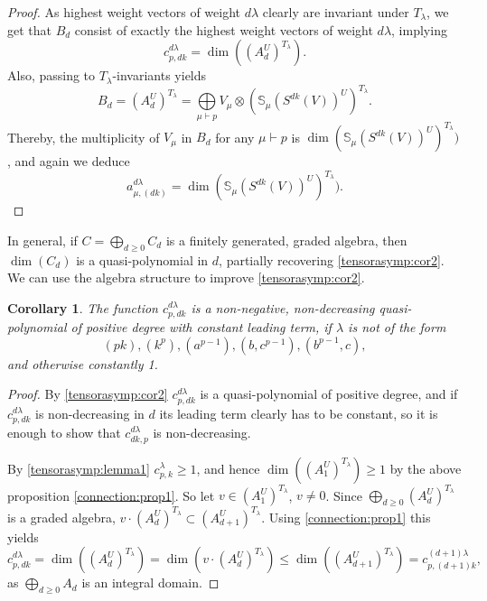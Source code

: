 \documentclass[a4paper]{amsart}
\newtheorem{corollary}{Corollary}
\begin{document}
\begin{proof}
	As highest weight vectors of weight $d\lambda$ clearly are invariant under $T_\lambda$,
	we get that $B_d$ consist of exactly the highest weight vectors of weight $d\lambda$,
	implying
	\begin{displaymath}
		c_{p,dk}^{d\lambda}=\dim((A_d^U)^{T_\lambda}).
	\end{displaymath}
	Also, passing to $T_\lambda$-invariants yields
	\begin{displaymath}
		B_d=(A_d^U)^{T_\lambda}=\bigoplus\limits_{\mu\vdash p}V_\mu\otimes(\mathbb{S}_\mu(S^{dk}(V))^U)^{T_\lambda}.
	\end{displaymath}
	Thereby, the multiplicity of $V_\mu$ in $B_d$ for any $\mu\vdash p$ is $\dim(\mathbb{S}_\mu(S^{dk}(V))^U)^{T_\lambda})$,
	and again we deduce
	\begin{displaymath}
		a_{\mu,(dk)}^{d\lambda}=
		\dim(\mathbb{S}_\mu(S^{dk}(V))^U)^{T_\lambda}).
	\end{displaymath}
\end{proof}
In general,
if $C=\bigoplus_{d\geq0}C_d$ is a finitely generated, graded algebra, then $\dim(C_d)$ is a quasi-polynomial in $d$,
partially recovering \cref{tensorasymp:cor2}. 
We can use the algebra structure to improve \cref{tensorasymp:cor2}.
\begin{corollary}\label{connection:cor1}
	The function $c_{p,dk}^{d\lambda}$ is a non-negative, non-decreasing quasi-polynomial of positive degree with constant leading term,
	if $\lambda$ is not of the form
	\begin{displaymath}
		(pk),(k^{p}),(a^{p-1}),(b,c^{p-1}),(b^{p-1},c),
	\end{displaymath}
	and otherwise constantly 1.
\end{corollary}
\begin{proof}
	By \cref{tensorasymp:cor2} $c_{p,dk}^{d\lambda}$ is a quasi-polynomial of positive degree,
	and if $c_{p,dk}^{d\lambda}$ is non-decreasing in $d$ its leading term clearly has to be constant,
	so it is enough to show that $c_{dk,p}^{d\lambda}$ is non-decreasing.
	
	By \cref{tensorasymp:lemma1} $c_{p,k}^{\lambda}\geq 1$,
	and hence $\dim((A_1^U)^{T_\lambda})\geq1$ by the above proposition \cref{connection:prop1}.
	So let $v\in(A_1^U)^{T_\lambda}$, $v\neq 0$.
	Since $\bigoplus_{d\geq0}(A_d^U)^{T_\lambda}$ is a graded algebra, $v\cdot(A_d^U)^{T_\lambda}\subset(A_{d+1}^U)^{T_\lambda}$.
	Using \cref{connection:prop1} this yields
	\begin{displaymath}
		c_{p,dk}^{d\lambda}=
		\dim((A_d^U)^{T_\lambda})=
		\dim(v\cdot(A_d^U)^{T_\lambda})\leq
		\dim((A_{d+1}^U)^{T_\lambda})=c_{p,(d+1)k}^{(d+1)\lambda},
	\end{displaymath}
	as $\bigoplus_{d\geq0}A_d$ is an integral domain.
\end{proof}
\end{document}
